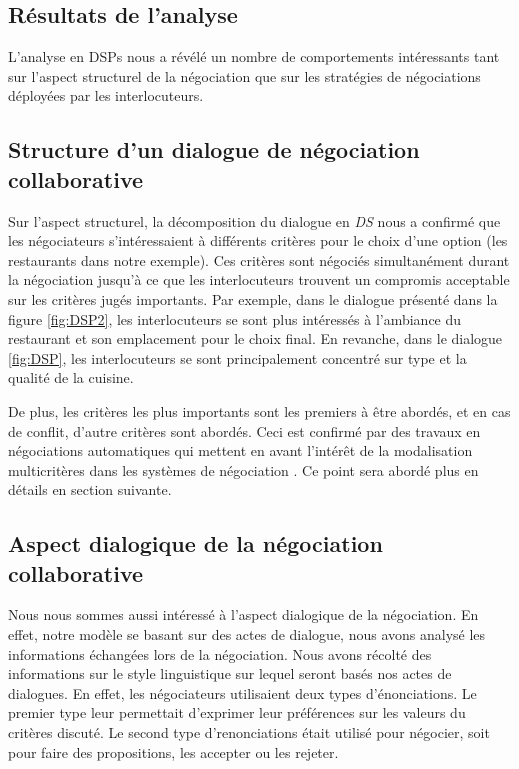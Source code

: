 		\subsection{Résultats de l'analyse}
		
			L'analyse en DSPs nous a révélé un nombre de comportements intéressants tant sur l'aspect structurel de la négociation que sur les stratégies de négociations déployées par les interlocuteurs. 	
			
			\subsection{Structure d'un dialogue de négociation collaborative}
			
					Sur l'aspect structurel, la décomposition du dialogue en \emph{DS} nous a confirmé que les négociateurs s'intéressaient à différents critères pour le choix d'une option (les restaurants dans notre exemple). Ces critères sont négociés simultanément durant la négociation jusqu'à ce que les interlocuteurs trouvent un compromis acceptable sur les critères jugés importants. 
					Par exemple, dans le dialogue présenté dans la figure \ref{fig:DSP2}, les interlocuteurs se sont plus intéressés à l'ambiance du restaurant et son emplacement pour le choix final. En revanche, dans le dialogue \ref{fig:DSP}, les interlocuteurs se sont principalement concentré sur type et la qualité de la cuisine.
					    
					De plus, les critères les plus importants sont les premiers à être abordés, et en cas de conflit, d'autre critères sont abordés. 
					Ceci est confirmé par des travaux en négociations automatiques qui mettent en avant l'intérêt de la modalisation multicritères dans les systèmes de négociation \cite{jonker2007agent,lai2004literature}. Ce point sera abordé plus en détails en section suivante. 
		
			\subsection{Aspect dialogique de la négociation collaborative}
					 \label{sec:aspectDial}
				 Nous nous sommes aussi intéressé à l'aspect dialogique de la négociation. En effet, notre modèle se basant sur des actes de dialogue, nous avons analysé les informations échangées lors de la négociation. 
				 Nous avons récolté des informations sur le style linguistique sur lequel seront basés nos actes de dialogues. En effet, les négociateurs utilisaient deux types d'énonciations. Le premier type leur permettait d'exprimer leur préférences sur les valeurs du critères discuté. Le second type d'renonciations était utilisé pour négocier, soit pour faire des propositions, les accepter ou les rejeter. 
				 
